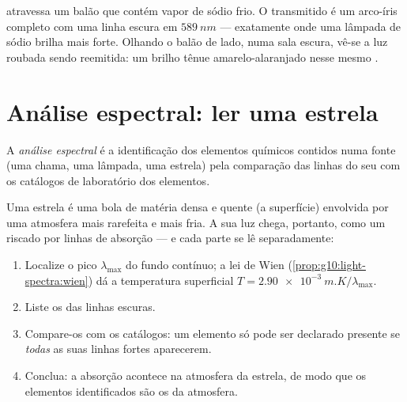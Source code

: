 \begin{example}\label{ex:g10:light-spectra:sodiumflask}
 atravessa um balão que contém vapor de sódio frio. O 
transmitido é um arco-íris completo com uma linha escura em $\qty{589}{nm}$
--- exatamente onde uma lâmpada de sódio brilha mais forte. Olhando o balão
de lado, numa sala escura, vê-se a luz roubada sendo reemitida: um brilho
tênue amarelo-alaranjado nesse mesmo .
\end{example}

\section{Análise espectral: ler uma estrela}

\begin{definition}\label{def:g10:light-spectra:analysis}
A \emph{análise espectral} é a identificação dos
elementos químicos contidos numa fonte (uma chama, uma lâmpada, uma estrela)
pela comparação das linhas do seu  com os catálogos de laboratório
dos elementos.
\end{definition}

\begin{method}\label{met:g10:light-spectra:reading}
Uma estrela é uma bola de matéria densa e quente (a superfície) envolvida
por uma atmosfera mais rarefeita e mais fria. A sua luz chega, portanto,
como um  riscado por linhas de absorção --- e cada parte se
lê separadamente:
\begin{enumerate}
  \item Localize o pico $\lambda_{\max}$ do fundo contínuo; a lei de Wien
        (\cref{prop:g10:light-spectra:wien}) dá a temperatura superficial
        $T = \qty{2.90e-3}{m.K} / \lambda_{\max}$.
  \item Liste os  das linhas escuras.
  \item Compare-os com os catálogos: um elemento só pode ser declarado
        presente se \emph{todas} as suas linhas fortes aparecerem.
  \item Conclua: a absorção acontece na atmosfera da estrela, de modo que os
        elementos identificados são os da atmosfera.
\end{enumerate}
\end{method}

